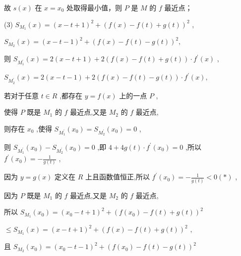 \documentclass[10pt]{article}
\newcommand*\circled[1]{\tikz[baseline=(char.base)]{\node[shape=circle,draw,inner sep=1.5pt] (char) {\small #1};}}
\begin{document}
故 \(s\left( x\right)\) 在 \(x = {x}_{0}\) 处取得最小值，则 \(P\) 是 \(M\) 的 \(f\) 最近点；

(3) \({S}_{{M}_{1}}\left( x\right)  = {\left( x - t + 1\right) }^{2} + {\left( f\left( x\right)  - f\left( t\right)  + g\left( t\right) \right) }^{2}\) ,

\({S}_{{M}_{2}}\left( x\right)  = {\left( x - t - 1\right) }^{2} + {\left( f\left( x\right)  - f\left( t\right)  - g\left( t\right) \right) }^{2},\)

则 \({S}_{{M}_{1}^{\prime }}\left( x\right)  = 2\left( {x - t + 1}\right)  + 2\left( {f\left( x\right)  - f\left( t\right)  + g\left( t\right) }\right)  \cdot  {f}^{\prime }\left( x\right)\) ,

\({S}_{{M}_{2}^{\prime }}\left( x\right)  = 2\left( {x - t - 1}\right)  + 2\left( {f\left( x\right)  - f\left( t\right)  - g\left( t\right) }\right)  \cdot  {f}^{\prime }\left( x\right) ,\)

若对于任意 \(t \in  R\) ,都存在 \(y = f\left( x\right)\) 上的一点 \(P\) ,

使得 \(P\) 既是 \({M}_{1}\) 的 \(f\) 最近点,又是 \({M}_{2}\) 的 \(f\) 最近点,

则存在 \({x}_{0}\) ,使得 \({S}_{{M}_{1}^{\prime }}\left( {x}_{0}\right)  = {S}_{{M}_{2}^{\prime }}\left( {x}_{0}\right)  = 0\) ,

则 \({S}_{{M}_{1}^{\prime }}\left( {x}_{0}\right)  - {S}_{{M}_{2}^{\prime }}\left( {x}_{0}\right)  = 0\) ,即 \(4 + {4g}\left( t\right)  \cdot  {f}^{\prime }\left( {x}_{0}\right)  = 0\) ,所以 \({f}^{\prime }\left( {x}_{0}\right)  =  - \frac{1}{g\left( t\right) }\) ,

因为 \(y = g\left( x\right)\) 定义在 \(R\) 上且函数值恒正,所以 \({f}^{\prime }\left( {x}_{0}\right)  =  - \frac{1}{g\left( t\right) } < 0\left( *\right)\) ,

因为 \(P\) 既是 \({M}_{1}\) 的 \(f\) 最近点,又是 \({M}_{2}\) 的 \(f\) 最近点,

所以 \({S}_{{M}_{1}}\left( {x}_{0}\right)  = {\left( {x}_{0} - t + 1\right) }^{2} + {\left( f\left( {x}_{0}\right)  - f\left( t\right)  + g\left( t\right) \right) }^{2}\)

\(\leq  {S}_{{M}_{1}}\left( x\right)  = {\left( x - t + 1\right) }^{2} + {\left( f\left( x\right)  - f\left( t\right)  + g\left( t\right) \right) }^{2}\)  \circled{1} ,

且 \({S}_{{M}_{2}}\left( {x}_{0}\right)  = {\left( {x}_{0} - t - 1\right) }^{2} + {\left( f\left( {x}_{0}\right)  - f\left( t\right)  - g\left( t\right) \right) }^{2}\)
\end{document}
